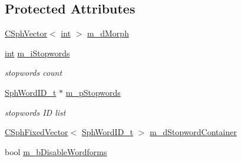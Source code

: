 \subsection*{Protected Attributes}
\begin{DoxyCompactItemize}
\item 
\hyperlink{classCSphVector}{C\-Sph\-Vector}$<$ \hyperlink{sphinxexpr_8cpp_a4a26e8f9cb8b736e0c4cbf4d16de985e}{int} $>$ \hyperlink{structCSphTemplateDictTraits_a456fd4bc5cd4f62dbaced4d8d424eeb9}{m\-\_\-d\-Morph}
\item 
\hyperlink{sphinxexpr_8cpp_a4a26e8f9cb8b736e0c4cbf4d16de985e}{int} \hyperlink{structCSphTemplateDictTraits_a5241c31528694ba6dc0ae423b1308e39}{m\-\_\-i\-Stopwords}
\begin{DoxyCompactList}\small\item\em stopwords count \end{DoxyCompactList}\item 
\hyperlink{sphinx_8h_a80a94d5984fdf9214a98f3e5e65df963}{Sph\-Word\-I\-D\-\_\-t} $\ast$ \hyperlink{structCSphTemplateDictTraits_ab6b4b575f3d4fa1c4e2dfda1940ab853}{m\-\_\-p\-Stopwords}
\begin{DoxyCompactList}\small\item\em stopwords I\-D list \end{DoxyCompactList}\item 
\hyperlink{classCSphFixedVector}{C\-Sph\-Fixed\-Vector}$<$ \hyperlink{sphinx_8h_a80a94d5984fdf9214a98f3e5e65df963}{Sph\-Word\-I\-D\-\_\-t} $>$ \hyperlink{structCSphTemplateDictTraits_a8a07412ac0515c8223e97108289baf83}{m\-\_\-d\-Stopword\-Container}
\item 
bool \hyperlink{structCSphTemplateDictTraits_aeb6ff537f9a46b9355ec1fd15fc4435c}{m\-\_\-b\-Disable\-Wordforms}
\end{DoxyCompactItemize}
